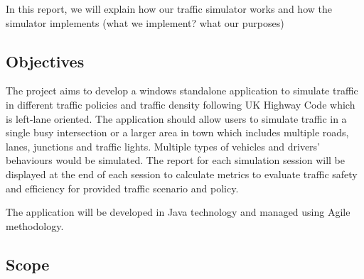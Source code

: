 \documentclass[11pt]{article}
\begin{document}
In this report, we will explain how our traffic simulator works and how the simulator implements (what we implement? what our purposes)
	


\subsection{Objectives}
The project aims to develop a windows standalone application to simulate traffic in different traffic policies and traffic density following UK Highway Code which is left-lane oriented. The application should allow users to simulate traffic in a single busy intersection or a larger area in town which includes multiple roads, lanes, junctions and traffic lights. Multiple types of vehicles and drivers' behaviours would be simulated. The report for each simulation session will be displayed at the end of each session to calculate metrics to evaluate traffic safety and efficiency for provided traffic scenario and policy.

The application will be developed in Java technology and managed using Agile methodology. 


\subsection{Scope}
\end{document}
